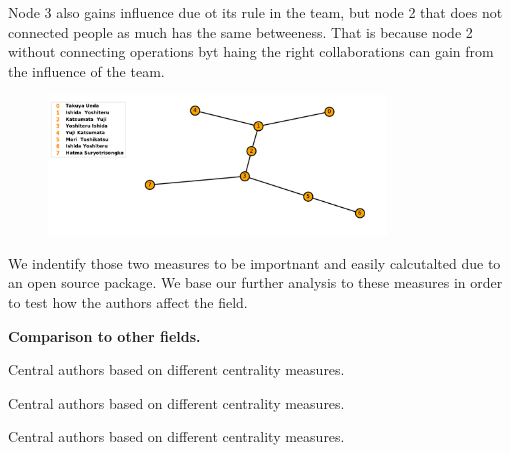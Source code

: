 \documentclass{article}
\begin{document}
Node 3 also gains influence due ot its rule in the team, but node 2 that does not
connected people as much has the same betweeness. That is because node 2 without connecting operations
byt haing the right collaborations can gain from the influence of the team.

\begin{figure}[!hbtp]
    \centering
    \includegraphics[width=0.8\textwidth]{./assets/images/centrality_example.pdf}
\end{figure}

We indentify those two measures to be importnant and easily calcutalted 
due to an open source package. We base our further analysis to these measures
in order to test how the authors affect the field.

\textbf{Comparison to other fields.}

\begin{table}[!hbtp]
    \begin{center}
    \scalebox{0.8}{
    
    }
    \caption{Central authors based on different centrality measures.}
    \label{table:central_authors_pd}
    \end{center}
\end{table}

\begin{table}[!hbtp]
    \begin{center}
    \scalebox{0.8}{
    
    }
    \caption{Central authors based on different centrality measures.}
    \label{table:central_authors_pd}
    \end{center}
\end{table}

\begin{table}[!hbtp]
    \begin{center}
    \scalebox{0.8}{
    
    }
    \caption{Central authors based on different centrality measures.}
    \label{table:central_authors_pd}
    \end{center}
\end{table}
\end{document}
